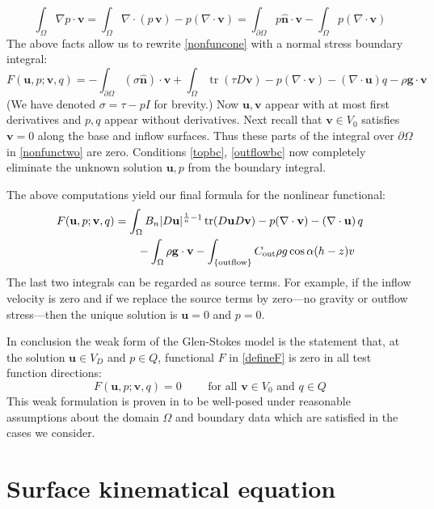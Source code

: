 \documentclass[letterpaper,final,12pt,reqno]{amsart}
\newcommand{\trace}{\operatorname{tr}}
\newcommand{\hbn}{\hat{\mathbf{n}}}
\newcommand{\bu}{\mathbf{u}}
\newcommand{\bv}{\mathbf{v}}
\begin{document}
    $$\int_\Omega \nabla p \cdot \bv = \int_\Omega \nabla\cdot (p\,\bv) - p (\nabla \cdot \bv) = \int_{\partial \Omega} p\hbn \cdot \bv - \int_\Omega p (\nabla \cdot \bv)$$
The above facts allow us to rewrite \eqref{nonfuncone} with a normal stress boundary integral:
\begin{equation}
F(\bu,p;\bv,q) = -\int_{\partial\Omega} (\sigma \hbn)\cdot \bv + \int_\Omega \trace(\tau D\bv) - p (\nabla \cdot \bv) - \left(\nabla \cdot \bu\right) q - \rho \mathbf{g} \cdot \bv \label{nonfunctwo}
\end{equation}
(We have denoted $\sigma=\tau-pI$ for brevity.)  Now $\bu,\bv$ appear with at most first derivatives and $p,q$ appear without derivatives.  Next recall that $\bv\in V_0$ satisfies $\bv=0$ along the base and inflow surfaces.  Thus these parts of the integral over $\partial\Omega$ in \eqref{nonfunctwo} are zero.  Conditions \eqref{topbc}, \eqref{outflowbc} now completely eliminate the unknown solution $\bu,p$ from the boundary integral.

The above computations yield our final formula for the nonlinear functional:
\begin{align}
F(\bu,p;\bv,q) &= \int_\Omega B_n |D\bu|^{\frac{1}{n} - 1} \trace(D\bu D\bv) - p (\nabla \cdot \bv) - \left(\nabla \cdot \bu\right) q \label{defineF} \\
    &\qquad  - \int_\Omega \rho \mathbf{g} \cdot \bv - \int_{\{\text{outflow}\}} C_{\text{out}} \rho g \cos\alpha (h-z) v  \notag
\end{align}
The last two integrals can be regarded as source terms.  For example, if the inflow velocity is zero and if we replace the source terms by zero---no gravity or outflow stress---then the unique solution is $\bu=0$ and $p=0$.

In conclusion the weak form of the Glen-Stokes model is the statement that, at the solution $\bu\in V_D$ and $p\in Q$, functional $F$ in \eqref{defineF} is zero in all test function directions:
\begin{equation}
F(\bu,p;\bv,q) = 0 \qquad \text{ for all } \bv\in V_0 \text{ and } q\in Q  \label{weak}
\end{equation}
This weak formulation is proven in \cite[Theorem 3.8]{JouvetRappaz2011} to be well-posed under reasonable assumptions about the domain $\Omega$ and boundary data which are satisfied in the cases we consider.


\section{Surface kinematical equation} \label{sec:kinematical}
\end{document}
